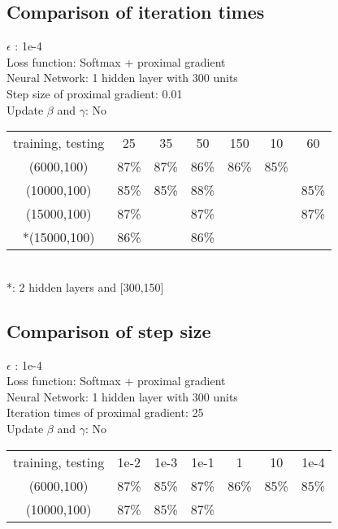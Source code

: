 \documentclass{article}
\begin{document}
\subsection{Comparison of iteration times}
\begin{center}
$\epsilon$ : 1e-4\\
Loss function: Softmax + proximal gradient\\
Neural Network: 1 hidden layer with 300 units\\
Step size of proximal gradient: 0.01 \\
Update $\beta$ and $\gamma$:  No\\
	\begin{tabular}{c c c c c c c}
	\hline
		{training, testing} & 25 & 35 & 50 & 150 & 10 & 60\\
		(6000,100) & 87\% & 87\% & 86\% & 86\% & 85\% &\\
		(10000,100) & 85\% & 85\% & 88\% & & & 85\% \\
		(15000,100) & 87\% & & 87\% & & & 87\% \\
	    *(15000,100) & 86\% & & 86\% & & & \\
	\hline
	\end{tabular}\\
	*: 2 hidden layers and [300,150]
\end{center}

\subsection{Comparison of step size }
\begin{center}
$\epsilon$ : 1e-4\\
Loss function: Softmax + proximal gradient\\
Neural Network: 1 hidden layer with 300 units\\
Iteration times of proximal gradient: 25 \\
Update $\beta$ and $\gamma$:  No\\
	\begin{tabular}{c c c c c c c}
	\hline
		{training, testing} & 1e-2 & 1e-3 & 1e-1 & 1 & 10 & 1e-4\\
		(6000,100) & 87\% & 85\% & 87\% & 86\% & 85\% & 85\%\\
		(10000,100) & 87\% & 85\% & 87\% & & & \\
	\hline
	\end{tabular}\\	
\end{center}
\end{document}
